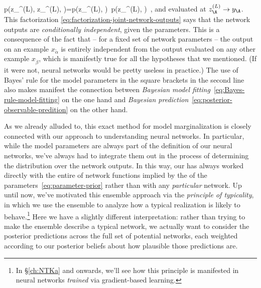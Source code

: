 p\!\le(z_{\A}^{(L)}\!, z_{\B}^{(L)}\Big\vert \theta, \Hypo \ri)=p\!\le(z_{\A}^{(L)}\Big\vert \theta, \Hypo \ri)\, p\!\le(z_{\B}^{(L)}\Big\vert \theta, \Hypo \ri)\, ,
\ee
and evaluated at $z_{\A}^{(L)} \to y_\A$. 
This factorization \eqref{eq:factorization-joint-network-outputs} says that the network outputs are \emph{conditionally independent}, given the parameters.
This is a consequence of the fact that -- for a fixed set of network parameters -- the output on an example $x_{\tilde{\alpha}}$ is entirely independent from the output evaluated on any other example $x_{\dot{\beta}}$, which is manifestly true for all the hypotheses that we mentioned. (If it were not, neural networks would be pretty useless in practice.) 
The use of Bayes' rule for the model parameters in the square brackets in the second line also makes manifest the connection between \emph{Bayesian model fitting}~\eqref{eq:Bayes-rule-model-fitting} on the one hand and \emph{Bayesian prediction}~\eqref{eq:posterior-observable-predition} on the other hand.

















As we already alluded to, this exact method for model marginalization is closely connected with our  approach to understanding neural networks. 
In particular, while the model parameters are always part of the definition of our neural networks, we've always had to integrate them out in the process of determining the distribution over the network outputs. In this way, our  has always worked directly with the entire  of network functions implied by the  of the parameters~\eqref{eq:parameter-prior} rather than with any \emph{particular} network. Up until now, we've motivated this ensemble approach via the \emph{principle of typicality}, in which we use the ensemble to analyze how a typical realization is likely to behave.\footnote{
    In \S\ref{ch:NTKa} and onwards, we'll see how this principle is manifested in neural networks \emph{trained} via gradient-based learning.
}
Here we have a slightly different interpretation: rather than trying to make the ensemble describe a typical network, we actually want to consider the posterior predictions across the full set of potential networks, each weighted according to our posterior beliefs about how plausible those predictions are.

